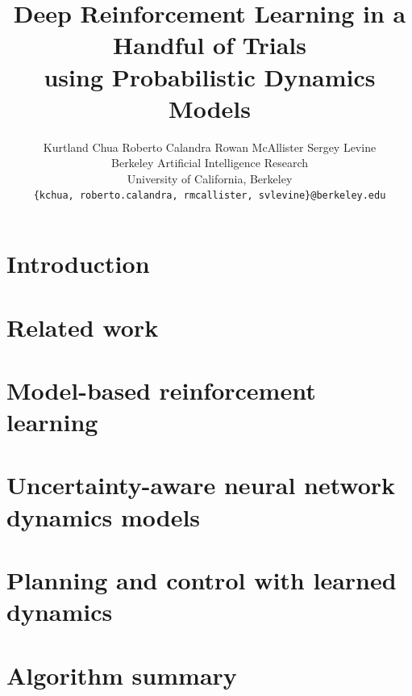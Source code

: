 \documentclass{article}
\title{Deep Reinforcement Learning in a Handful of Trials\\ using Probabilistic Dynamics Models}
\author{
  Kurtland Chua \hspace{10mm} Roberto Calandra \hspace{10mm} Rowan McAllister \hspace{10mm} Sergey Levine \\
  Berkeley Artificial Intelligence Research \\
  University of California, Berkeley \\
  \texttt{\{kchua, roberto.calandra, rmcallister, svlevine\}@berkeley.edu}
}
\begin{document}
\maketitle

\begin{abstract}
	
\end{abstract}


\section{Introduction}



\section{Related work}
\label{sec:related}

    

\section{Model-based reinforcement learning}
\label{sec:background}



\section{Uncertainty-aware neural network dynamics models}
\label{sec:dynamics-models}


\section{Planning and control with learned dynamics}
\label{sec:approach:propagation}

    
\section{Algorithm summary}
\label{sec:approach3}

    
\end{document}
